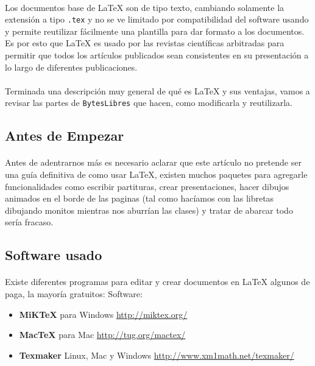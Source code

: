 \paragraph{} Los documentos base de \LaTeX{} son de tipo texto, cambiando solamente la extensión a tipo \texttt{.tex} y no se ve limitado por compatibilidad del software usando y permite reutilizar fácilmente una plantilla para dar formato a los documentos. Es por esto que \LaTeX{} es usado por las revistas científicas arbitradas para permitir que todos los artículos publicados sean consistentes en su presentación a lo largo de diferentes publicaciones.
\paragraph{}Terminada una descripción muy general de qué es \LaTeX{} y sus ventajas, vamos a revisar las partes de \texttt{BytesLibres} que hacen, como modificarla y reutilizarla.

\subsection*{Antes de Empezar}
\paragraph{} Antes de adentrarnos más es necesario aclarar que este artículo no pretende ser una guía definitiva de como usar
\LaTeX{}, existen muchos paquetes para agregarle funcionalidades como escribir partituras, crear presentaciones, hacer dibujos
animados en el borde de las paginas (tal como hacíamos con las libretas dibujando monitos mientras nos aburrían las clases) y
tratar de abarcar todo sería fracaso.

\subsection*{Software usado}
\paragraph{}Existe diferentes programas para editar y crear documentos en \LaTeX{} algunos de paga, la mayoría gratuitos:
\Remark
   {Software:}
   {
   \begin{itemize}
   \item \textbf{MiKTeX} para Windows \href{http://miktex.org/}{http://miktex.org/}
   \item \textbf{MacTeX} para Mac \href{http://tug.org/mactex/}{http://tug.org/mactex/}
   \item \textbf{Texmaker} Linux, Mac y Windows \href{http://www.xm1math.net/texmaker/}{http://www.xm1math.net/texmaker/}
   \end{itemize}
   }


